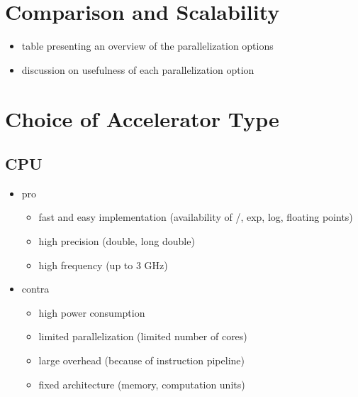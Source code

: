 \documentclass[mscthesis]{usiinfthesis}
\begin{document}
\section{Comparison and Scalability}
\label{ch:analysis_all}

\begin{itemize}
    \item table presenting an overview of the parallelization options
    \item discussion on usefulness of each parallelization option
\end{itemize}

\section{Choice of Accelerator Type}
\label{ch:analysis_choice}

\subsection{CPU}
\begin{itemize}
    \item pro
    \begin{itemize}
        \item fast and easy implementation (availability of /, exp, log,
            floating points)
        \item high precision (double, long double)
        \item high frequency (up to 3 GHz)
    \end{itemize}
    \item contra
    \begin{itemize}
        \item high power consumption
        \item limited parallelization (limited number of cores)
        \item large overhead (because of instruction pipeline)
        \item fixed architecture (memory, computation units)
    \end{itemize}
\end{itemize}

\end{document}
